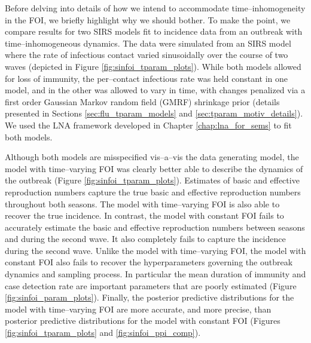 Before delving into details of how we intend to accommodate time--inhomogeneity in the FOI, we briefly highlight why we should bother. To make the point, we compare results for two SIRS models fit to incidence data from an outbreak with time--inhomogeneous dynamics. The data were simulated from an SIRS model where the rate of infectious contact varied sinusoidally over the course of two waves (depicted in Figure \ref{fig:sinfoi_tparam_plots}). While both models allowed for loss of immunity, the per--contact infectious rate was held constant in one model, and in the other was allowed to vary in time, with changes penalized via a first order Gaussian Markov random field (GMRF) shrinkage prior (details presented in Sections \ref{sec:flu_tparam_models} and \ref{sec:tparam_motiv_details}). We used the LNA framework developed in Chapter \ref{chap:lna_for_sems} to fit both models. 

Although both models are misspecified vis--a--vis the  data generating model, the model with time--varying FOI was clearly better able to describe the dynamics of the outbreak (Figure \ref{fig:sinfoi_tparam_plots}). Estimates of basic and effective reproduction numbers capture the true basic and effective reproduction numbers throughout both seasons. The model with time--varying FOI is also able to recover the true incidence. In contrast, the model with constant FOI fails to accurately estimate the basic and effective reproduction numbers between seasons and during the second wave. It also completely fails to capture the incidence during the second wave. Unlike the model with time--varying FOI, the model with constant FOI also fails to recover the hyperparameters governing the outbreak dynamics and sampling process. In particular the mean duration of immunity and case detection rate are important parameters that are poorly estimated (Figure \ref{fig:sinfoi_param_plots}). Finally, the posterior predictive distributions for the model with time--varying FOI are more accurate, and more precise, than posterior predictive distributions for the model with constant FOI (Figures \ref{fig:sinfoi_tparam_plots} and \ref{fig:sinfoi_ppi_comp}).

